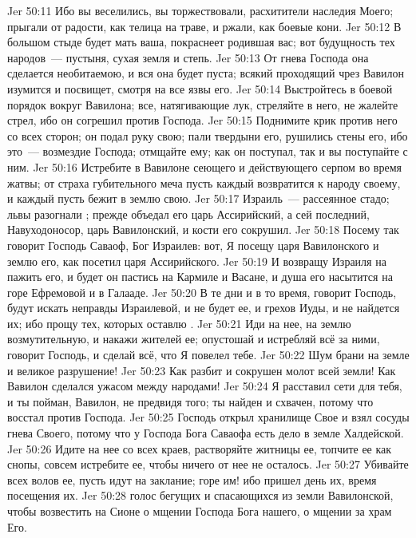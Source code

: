 \vs Jer 50:11 Ибо вы веселились, вы торжествовали, расхитители наследия Моего; прыгали от радости, как телица на траве, и ржали, как боевые кони.
\vs Jer 50:12 В большом стыде будет мать ваша, покраснеет родившая вас; вот будущность тех народов~--- пустыня, сухая земля и степь.
\vs Jer 50:13 От гнева Господа она сделается необитаемою, и вся она будет пуста; всякий проходящий чрез Вавилон изумится и посвищет, смотря на все язвы его.
\vs Jer 50:14 Выстройтесь в боевой порядок вокруг Вавилона; все, натягивающие лук, стреляйте в него, не жалейте стрел, ибо он согрешил против Господа.
\vs Jer 50:15 Поднимите крик против него со всех сторон; он подал руку свою; пали твердыни его, рушились стены его, ибо это~--- возмездие Господа; отмщайте ему; как он поступал, так и вы поступайте с ним.
\vs Jer 50:16 Истребите в Вавилоне  сеющего и действующего серпом во время жатвы; от страха губительного меча пусть каждый возвратится к народу своему, и каждый пусть бежит в землю свою.
\vs Jer 50:17 Израиль~--- рассеянное стадо; львы разогнали ; прежде объедал его царь Ассирийский, а сей последний, Навуходоносор, царь Вавилонский, и кости его сокрушил.
\vs Jer 50:18 Посему так говорит Господь Саваоф, Бог Израилев: вот, Я посещу царя Вавилонского и землю его, как посетил царя Ассирийского.
\vs Jer 50:19 И возвращу Израиля на пажить его, и будет он пастись на Кармиле и Васане, и душа его насытится на горе Ефремовой и в Галааде.
\vs Jer 50:20 В те дни и в то время, говорит Господь, будут искать неправды Израилевой, и не будет ее, и грехов Иуды, и не найдется их; ибо прощу тех, которых оставлю .
\vs Jer 50:21 Иди на нее, на землю возмутительную, и накажи жителей ее; опустошай и истребляй всё за ними, говорит Господь, и сделай всё, что Я повелел тебе.
\vs Jer 50:22 Шум брани на земле и великое разрушение!
\vs Jer 50:23 Как разбит и сокрушен молот всей земли! Как Вавилон сделался ужасом между народами!
\vs Jer 50:24 Я расставил сети для тебя, и ты пойман, Вавилон, не предвидя того; ты найден и схвачен, потому что восстал против Господа.
\vs Jer 50:25 Господь открыл хранилище Свое и взял  сосуды гнева Своего, потому что у Господа Бога Саваофа есть дело в земле Халдейской.
\vs Jer 50:26 Идите на нее со всех краев, растворяйте житницы ее, топчите ее как снопы, совсем истребите ее, чтобы ничего от нее не осталось.
\vs Jer 50:27 Убивайте всех волов ее, пусть идут на заклание; горе им! ибо пришел день их, время посещения их.
\vs Jer 50:28  голос бегущих и спасающихся из земли Вавилонской, чтобы возвестить на Сионе о мщении Господа Бога нашего, о мщении за храм Его.
